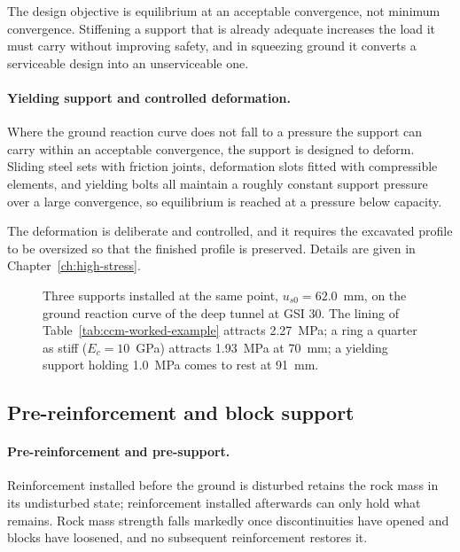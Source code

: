 The design objective is equilibrium at an acceptable convergence, not minimum
convergence. Stiffening a support that is already adequate increases the load
it must carry without improving safety, and in squeezing ground it converts a
serviceable design into an unserviceable one.

\paragraph{Yielding support and controlled deformation.}
Where the ground reaction curve does not fall to a pressure the support can
carry within an acceptable convergence, the support is designed to
deform. Sliding steel sets with friction joints, deformation slots fitted with
compressible elements, and yielding bolts all maintain a roughly constant
support pressure over a large convergence, so equilibrium is reached at a
pressure below capacity.

The deformation is deliberate and controlled,
and it requires the excavated profile to be oversized so that the finished
profile is preserved. Details are given in Chapter~\ref{ch:high-stress}.

\begin{figure}[htbp]
\centering
{}
\caption{Three supports installed at the same point, $u_{s0} = 62.0$~mm, on the ground reaction curve of the deep tunnel at GSI 30. The lining of Table~\ref{tab:ccm-worked-example} attracts 2.27~MPa; a ring a quarter as stiff ($E_c = 10$~GPa) attracts 1.93~MPa at 70~mm; a yielding support holding 1.0~MPa comes to rest at 91~mm.}
\label{fig:stiff-yielding}
\end{figure}

\subsection{Pre-reinforcement and block support}
\label{sec:pre-reinforcement-and-block-support}

\paragraph{Pre-reinforcement and pre-support.}
Reinforcement installed before the ground is disturbed retains the rock mass
in its undisturbed state; reinforcement installed afterwards can only hold
what remains. Rock mass strength falls
markedly once discontinuities have opened and blocks have loosened, and no
subsequent reinforcement restores it.

